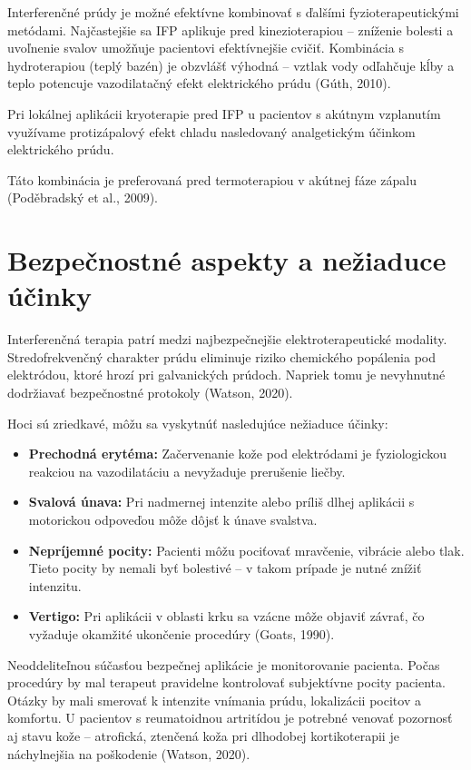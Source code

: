 Interferenčné prúdy je možné efektívne kombinovať s ďalšími fyzioterapeutickými metódami. Najčastejšie sa IFP aplikuje pred kinezioterapiou – zníženie bolesti a uvoľnenie svalov umožňuje pacientovi efektívnejšie cvičiť. Kombinácia s hydroterapiou (teplý bazén) je obzvlášť výhodná – vztlak vody odľahčuje kĺby a teplo potencuje vazodilatačný efekt elektrického prúdu (Gúth, 2010). 

Pri lokálnej aplikácii kryoterapie pred IFP u pacientov s akútnym vzplanutím využívame protizápalový efekt chladu nasledovaný analgetickým účinkom elektrického prúdu. 

Táto kombinácia je preferovaná pred termoterapiou v akútnej fáze zápalu (Poděbradský et al., 2009). 

\section{Bezpečnostné aspekty a nežiaduce účinky}

Interferenčná terapia patrí medzi najbezpečnejšie elektroterapeutické modality. Stredofrekvenčný charakter prúdu eliminuje riziko chemického popálenia pod elektródou, ktoré hrozí pri galvanických prúdoch. Napriek tomu je nevyhnutné dodržiavať bezpečnostné protokoly (Watson, 2020). 

\noindent Hoci sú zriedkavé, môžu sa vyskytnúť nasledujúce nežiaduce účinky:

\begin{itemize}
    \item \textbf{Prechodná erytéma:} Začervenanie kože pod elektródami je fyziologickou reakciou na vazodilatáciu a nevyžaduje prerušenie liečby.
    \item \textbf{Svalová únava:} Pri nadmernej intenzite alebo príliš dlhej aplikácii s motorickou odpoveďou môže dôjsť k únave svalstva.
    \item \textbf{Nepríjemné pocity:} Pacienti môžu pociťovať mravčenie, vibrácie alebo tlak. Tieto pocity by nemali byť bolestivé – v takom prípade je nutné znížiť intenzitu.
    \item \textbf{Vertigo:} Pri aplikácii v oblasti krku sa vzácne môže objaviť závrať, čo vyžaduje okamžité ukončenie procedúry (Goats, 1990).
\end{itemize}

Neoddeliteľnou súčasťou bezpečnej aplikácie je monitorovanie pacienta. Počas procedúry by mal terapeut pravidelne kontrolovať subjektívne pocity pacienta. Otázky by mali smerovať k intenzite vnímania prúdu, lokalizácii pocitov a komfortu. U pacientov s reumatoidnou artritídou je potrebné venovať pozornosť aj stavu kože – atrofická, ztenčená koža pri dlhodobej kortikoterapii je náchylnejšia na poškodenie (Watson, 2020). 

